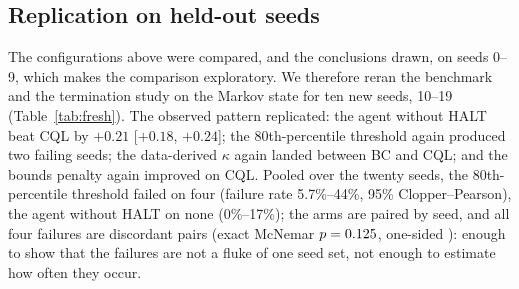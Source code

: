 \documentclass[11pt]{article}
\begin{document}
\subsection{Replication on held-out seeds}\label{sec:fresh}

The configurations above were compared, and the conclusions drawn, on seeds 0--9, which makes the comparison exploratory. We therefore reran the benchmark and the termination study on the Markov state for ten new seeds, 10--19 (Table~\ref{tab:fresh}). The observed pattern replicated: the agent without HALT beat CQL by $+0.21$ [$+0.18$, $+0.24$]; the 80th-percentile threshold again produced two failing seeds; the data-derived $\kappa$ again landed between BC and CQL; and the bounds penalty again improved on CQL. Pooled over the twenty seeds, the 80th-percentile threshold failed on four (failure rate 5.7\%--44\%, 95\% Clopper--Pearson), the agent without HALT on none (0\%--17\%); the arms are paired by seed, and all four failures are discordant pairs (exact McNemar $p=0.125$, one-sided \haltmcnemarone): enough to show that the failures are not a fluke of one seed set, not enough to estimate how often they occur.

\begin{table}[h]
\centering\small
{}
\caption{Replication on held-out seeds 10--19, Markov state. Intervals as in Table~\ref{tab:factorial}.}
\label{tab:fresh}
\end{table}
\end{document}
